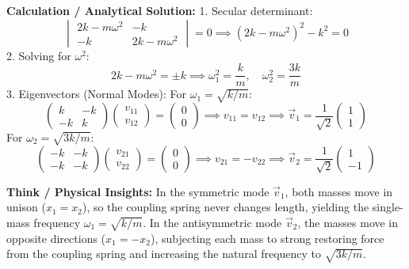 \begin{psctexample}
\textbf{\color{rbruNavy}Calculation / Analytical Solution:}
1. Secular determinant:
\begin{equation}
\begin{vmatrix} 2k - m\omega^2 & -k \\ -k & 2k - m\omega^2 \end{vmatrix} = 0 \implies (2k - m\omega^2)^2 - k^2 = 0
\end{equation}
2. Solving for $\omega^2$:
\begin{equation}
2k - m\omega^2 = \pm k \implies \omega_1^2 = \frac{k}{m}, \quad \omega_2^2 = \frac{3k}{m}
\end{equation}
3. Eigenvectors (Normal Modes):
For $\omega_1 = \sqrt{k/m}$:
\begin{equation}
\begin{pmatrix} k & -k \\ -k & k \end{pmatrix}\begin{pmatrix} v_{11} \\ v_{12} \end{pmatrix} = \begin{pmatrix} 0 \\ 0 \end{pmatrix} \implies v_{11} = v_{12} \implies \vec{v}_1 = \frac{1}{\sqrt{2}}\begin{pmatrix} 1 \\ 1 \end{pmatrix}
\end{equation}
For $\omega_2 = \sqrt{3k/m}$:
\begin{equation}
\begin{pmatrix} -k & -k \\ -k & -k \end{pmatrix}\begin{pmatrix} v_{21} \\ v_{22} \end{pmatrix} = \begin{pmatrix} 0 \\ 0 \end{pmatrix} \implies v_{21} = -v_{22} \implies \vec{v}_2 = \frac{1}{\sqrt{2}}\begin{pmatrix} 1 \\ -1 \end{pmatrix}
\end{equation}

\textbf{\color{rbruNavy}Think / Physical Insights:}
In the symmetric mode $\vec{v}_1$, both masses move in unison ($x_1 = x_2$), so the coupling spring never changes length, yielding the single-mass frequency $\omega_1 = \sqrt{k/m}$. In the antisymmetric mode $\vec{v}_2$, the masses move in opposite directions ($x_1 = -x_2$), subjecting each mass to strong restoring force from the coupling spring and increasing the natural frequency to $\sqrt{3k/m}$.
\qedexam
\end{psctexample}

